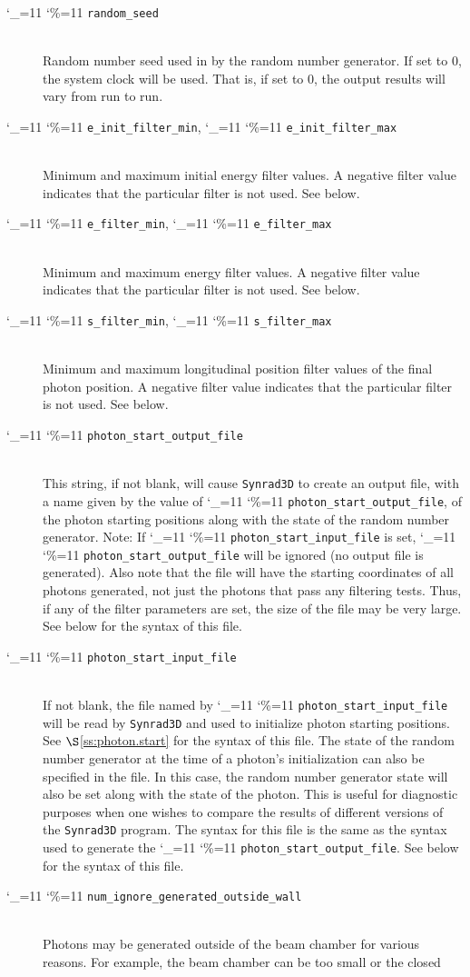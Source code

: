 \documentclass[11pt,openany]{report}
\newcommand{\sref}[1]{$\S$\ref{#1}}
\newcommand{\srthree}{\texttt{Synrad3D}\xspace}
\newcommand\ttcmd{\begingroup\catcode`\_=11 \catcode`\%=11 \dottcmd}
\newcommand\dottcmd[1]{\texttt{#1}\endgroup}
\newcommand{\vn}{\ttcmd}
\newcommand{\Newline}{\hfil \\}
\begin{document}
\begin{description}
  \item[\vn{random_seed}] \Newline
Random number seed used in by the random number generator. If set to 0, the system clock
will be used. That is, if set to 0, the output results will vary from run to run. 
  \item[\vn{e_init_filter_min}, \vn{e_init_filter_max}] \Newline
Minimum and maximum initial energy filter values. A negative filter value
indicates that the particular filter is not used. See below.
  \item[\vn{e_filter_min}, \vn{e_filter_max}] \Newline
Minimum and maximum energy filter values. A negative filter value
indicates that the particular filter is not used. See below.
  \item[\vn{s_filter_min}, \vn{s_filter_max}] \Newline
Minimum and maximum longitudinal position filter values of the final
photon position. A negative filter value indicates that the particular
filter is not used. See below.
  \item[\vn{photon_start_output_file}] \Newline
This string, if not blank, will cause \srthree to create an output
file, with a name given by the value of \vn{photon_start_output_file},
of the photon starting positions along with the state of the random
number generator. Note: If \vn{photon_start_input_file} is set,
\vn{photon_start_output_file} will be ignored (no output file is
generated). Also note that the file will have the starting coordinates
of all photons generated, not just the photons that pass any filtering
tests. Thus, if any of the filter parameters are set, the size of the
file may be very large. See below for the syntax of this file.
  \item[\vn{photon_start_input_file}] \Newline
If not blank, the file named by \vn{photon_start_input_file}
will be read by \srthree and used to initialize photon
starting positions. See \sref{ss:photon.start} for the syntax of this file.
The state of the random number generator at the time of a photon's
initialization can also be specified in the file. In this case, the
random number generator state will also be set along with the state of
the photon. This is useful for diagnostic purposes when one wishes to
compare the results of different versions of the \srthree program. The
syntax for this file is the same as the syntax used to generate the
\vn{photon_start_output_file}. See below for the syntax of this file.
  \item[\vn{num_ignore_generated_outside_wall}] \Newline
Photons may be generated outside of the beam chamber for various
reasons. For example, the beam chamber can be too small or the closed

\end{description}
\end{document}
